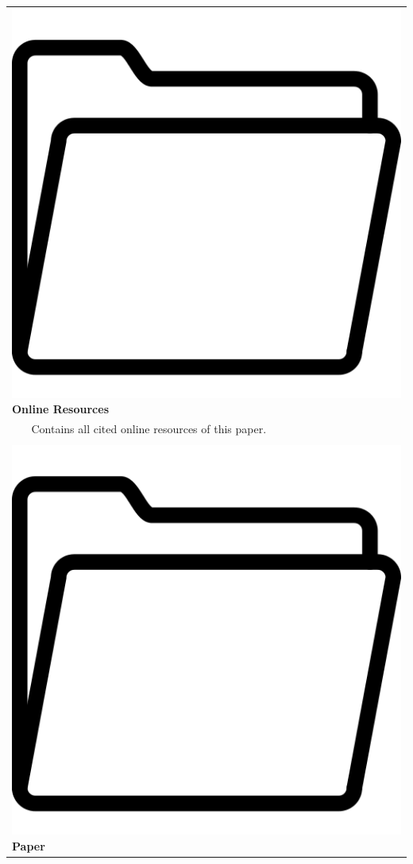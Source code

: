 \begin{table}[ht]
\begin{tabularx}{\textwidth}{llX}
    \multicolumn{3}{l}{\includegraphics[height=.014\textheight]{Figures/icon_folder.png} \textbf{Online Resources}}               \\
    \hspace{.066\textwidth}   & \multicolumn{2}{l}{Contains all cited online resources of this paper.}                         \\
                  &             &                                         \\
    \multicolumn{3}{l}{\includegraphics[height=.014\textheight]{Figures/icon_folder.png} \textbf{Paper}}              \\

\end{tabularx}
\end{table}
